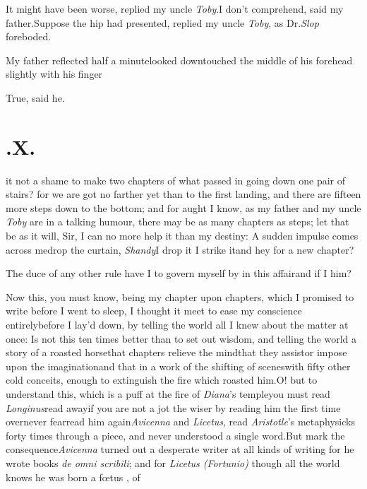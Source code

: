 \documentclass{article}
\begin{document}
It might have been worse, replied my uncle
\textit{Toby}.\tsk I don’t comprehend, said my
father.\tsk Suppose the hip had presented, replied my
uncle \textit{Toby}, as Dr.\@ \textit{Slop} foreboded.

My father reflected half a minute\tsk looked down\tsk touched the middle of his
forehead slightly with his finger\tsh

\tsk True, said he.

\parskip
{}
\newpage
\null\smallskip
\section{.\enspace X.}

 it not a shame to make two chapters of what passed in going down one
pair of stairs? for we are got no farther yet than to the first landing, and there
are fifteen more steps down to the bottom; and for aught I know, as my father and my
uncle \textit{Toby} are in a talking humour, there may be as
many chapters as steps;\tsk
let that be as it will, Sir, I can no more help it than my
destiny:\tsk\break
A sudden impulse comes across me\tsh drop the curtain,
\textit{Shandy}\tsk I drop it\tsh 
{}\break
\tsk I strike it\tsk and hey for a new chapter?

The duce of any other rule have I to govern myself by in
this affair\tsk and if I
him?

Now this, you must know, being my chapter upon chapters,
which I promised to write before I went to sleep, I thought
it meet to ease my conscience entirely\break before I lay’d down,
by telling the world all I knew about the matter at once: Is
not this ten times better than to set out  wisdom, and telling the world a
story of a roasted horse\tsk that chapters relieve the
mind\tsk that they assist\tsk or impose upon the
imagination\tsk and that in a work of\break
{}
the shifting of scenes\tsh with
fifty other cold conceits, enough to extinguish the fire
which roasted him.\tsk O! but to understand this, which is a
puff at the fire of \textit{Diana}’s temple\tsk you must
read \textit{Lon\-ginus}\tsk read away\tsk if you are not a
jot the wiser by reading him the first time over\break\tsk never
fear\tsk read him again\tsk \textit{Avicenna} and
\textit{Licetus}, read \textit{Aristotle}’s metaphysicks
forty times through a piece, and never understood a single
word.\tsk But mark the consequence\tsk \textit{Avicenna}
turned out a desperate writer at all kinds of writing\tsk
for he wrote books \textit{de omni scribili}; and for
\textit{Licetus (Fortunio)} though all the world knows he
was born a fœtus \fnast, of\break
{}
\end{document}

